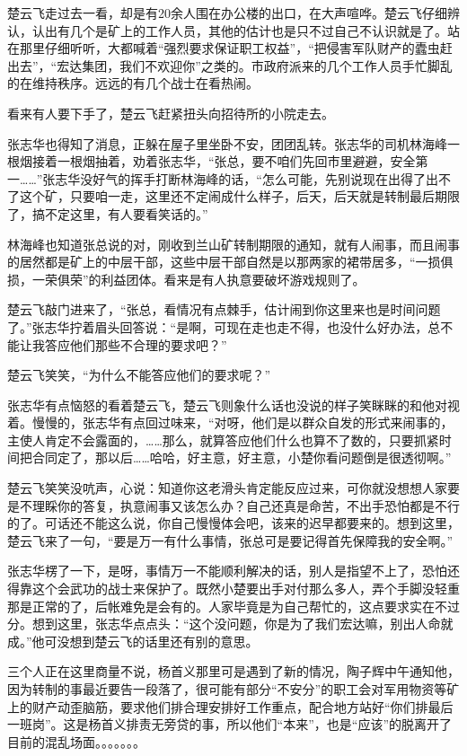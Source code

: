 楚云飞走过去一看，却是有20余人围在办公楼的出口，在大声喧哗。楚云飞仔细辨认，认出有几个是矿上的工作人员，其他的估计也是只不过自己不认识就是了。站在那里仔细听听，大都喊着“强烈要求保证职工权益”，“把侵害军队财产的蠹虫赶出去”，“宏达集团，我们不欢迎你”之类的。市政府派来的几个工作人员手忙脚乱的在维持秩序。远远的有几个战士在看热闹。

看来有人要下手了，楚云飞赶紧扭头向招待所的小院走去。

张志华也得知了消息，正躲在屋子里坐卧不安，团团乱转。张志华的司机林海峰一根烟接着一根烟抽着，劝着张志华，“张总，要不咱们先回市里避避，安全第一……”张志华没好气的挥手打断林海峰的话，“怎么可能，先别说现在出得了出不了这个矿，只要咱一走，这里还不定闹成什么样子，后天，后天就是转制最后期限了，搞不定这里，有人要看笑话的。”

林海峰也知道张总说的对，刚收到兰山矿转制期限的通知，就有人闹事，而且闹事的居然都是矿上的中层干部，这些中层干部自然是以那两家的裙带居多，“一损俱损，一荣俱荣”的利益团体。看来是有人执意要破坏游戏规则了。

楚云飞敲门进来了，“张总，看情况有点棘手，估计闹到你这里来也是时间问题了。”张志华拧着眉头回答说：“是啊，可现在走也走不得，也没什么好办法，总不能让我答应他们那些不合理的要求吧？”

楚云飞笑笑，“为什么不能答应他们的要求呢？”

张志华有点恼怒的看着楚云飞，楚云飞则象什么话也没说的样子笑眯眯的和他对视着。慢慢的，张志华有点回过味来，“对呀，他们是以群众自发的形式来闹事的，主使人肯定不会露面的，……那么，就算答应他们什么也算不了数的，只要抓紧时间把合同定了，那以后……哈哈，好主意，好主意，小楚你看问题倒是很透彻啊。”

楚云飞笑笑没吭声，心说：知道你这老滑头肯定能反应过来，可你就没想想人家要是不理睬你的答复，执意闹事又该怎么办？自己还真是命苦，不出手恐怕都是不行的了。可话还不能这么说，你自己慢慢体会吧，该来的迟早都要来的。想到这里，楚云飞来了一句，“要是万一有什么事情，张总可是要记得首先保障我的安全啊。”

张志华楞了一下，是呀，事情万一不能顺利解决的话，别人是指望不上了，恐怕还得靠这个会武功的战士来保护了。既然小楚要出手对付那么多人，弄个手脚没轻重那是正常的了，后帐难免是会有的。人家毕竟是为自己帮忙的，这点要求实在不过分。想到这里，张志华点点头：“这个没问题，你是为了我们宏达嘛，别出人命就成。”他可没想到楚云飞的话里还有别的意思。

三个人正在这里商量不说，杨首义那里可是遇到了新的情况，陶子辉中午通知他，因为转制的事最近要告一段落了，很可能有部分“不安分”的职工会对军用物资等矿上的财产动歪脑筋，要求他们排合理安排好工作重点，配合地方站好“你们排最后一班岗”。这是杨首义排责无旁贷的事，所以他们“本来”，也是“应该”的脱离开了目前的混乱场面。。。。。。。

